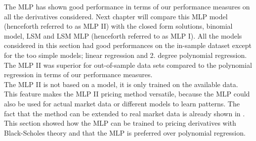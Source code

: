 The MLP has shown good performance in terms of our performance measures on all the derivatives considered. Next chapter will compare this MLP model (henceforth referred to as MLP II) with the closed form solutions, binomial model, LSM and LSM MLP (henceforth referred to as MLP I). All the models considered in this section had good performances on the in-sample dataset except for the too simple models; linear regression and 2. degree polynomial regression. The MLP II was superior for out-of-sample data sets compared to the polynomial regression in terms of our performance measures.\\

The MLP II is not based on a model, it is only trained on the available data. This feature makes the MLP II pricing method versatile, because the MLP could also be used for actual market data or different models to learn patterns. The fact that the method can be extended to real market data is already shown in \parencite{GasparRaquel20}. This section showed how the MLP can be trained to pricing derivatives with Black-Scholes theory and that the MLP is preferred over polynomial regression.









